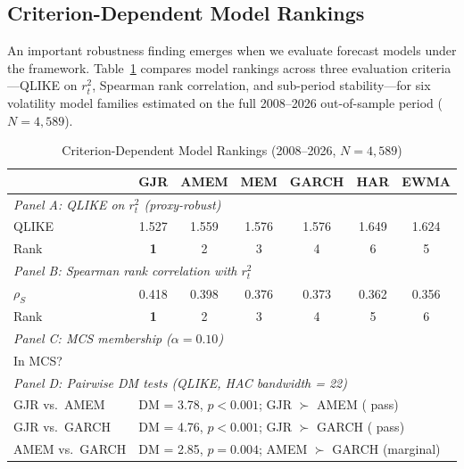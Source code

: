 \documentclass[12pt,a4paper]{article}
\newcommand{\cmark}{\ding{51}}
\newcommand{\xmark}{\ding{55}}
\begin{document}
\subsection{Criterion-Dependent Model Rankings}
\label{sec:criterion_dependent}

An important robustness finding emerges when we evaluate forecast models under the \citet{patton2011} framework. Table~\ref{tab:criterion_dependent} compares model rankings across three evaluation criteria---QLIKE on $r_t^2$, Spearman rank correlation, and sub-period stability---for six volatility model families estimated on the full 2008--2026 out-of-sample period ($N = 4{,}589$).

\begin{table}[H]
\centering
\small
\begin{threeparttable}
\caption{Criterion-Dependent Model Rankings (2008--2026, $N = 4{,}589$)}
\label{tab:criterion_dependent}
\begin{tabular}{@{}lcccccc@{}}
\toprule
& GJR & AMEM & MEM & GARCH & HAR & EWMA \\
\midrule
\multicolumn{7}{l}{\textit{Panel A: QLIKE on $r_t^2$ (proxy-robust)}} \\
QLIKE & 1.527 & 1.559 & 1.576 & 1.576 & 1.649 & 1.624 \\
Rank & \textbf{1} & 2 & 3 & 4 & 6 & 5 \\
\midrule
\multicolumn{7}{l}{\textit{Panel B: Spearman rank correlation with $r_t^2$}} \\
$\rho_S$ & 0.418 & 0.398 & 0.376 & 0.373 & 0.362 & 0.356 \\
Rank & \textbf{1} & 2 & 3 & 4 & 5 & 6 \\
\midrule
\multicolumn{7}{l}{\textit{Panel C: MCS membership ($\alpha = 0.10$)}} \\
In MCS? & \cmark & \xmark & \xmark & \xmark & \xmark & \xmark \\
\midrule
\multicolumn{7}{l}{\textit{Panel D: Pairwise DM tests (QLIKE, HAC bandwidth = 22)}} \\
GJR vs.\ AMEM & \multicolumn{6}{l}{DM = 3.78, $p < 0.001$; GJR $\succ$ AMEM (\citet{harvey2016} pass)} \\
GJR vs.\ GARCH & \multicolumn{6}{l}{DM = 4.76, $p < 0.001$; GJR $\succ$ GARCH (\citet{harvey2016} pass)} \\
AMEM vs.\ GARCH & \multicolumn{6}{l}{DM = 2.85, $p = 0.004$; AMEM $\succ$ GARCH (marginal)} \\
\bottomrule
\end{tabular}

\end{threeparttable}
\end{table}
\end{document}
